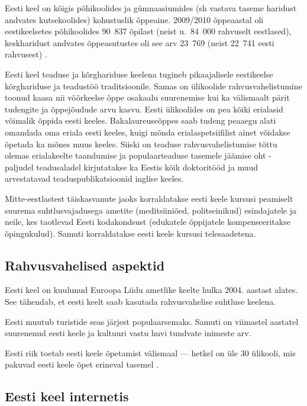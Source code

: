\documentclass[]{../metanetpaper}
\begin{document}
\begin{multicols}{2}
Eesti keel on kõigis põhikoolides ja gümnaasiumides (sh vastava taseme haridust andvates kutsekoolides) kohustuslik õppeaine. 
2009/2010 õppeaastal oli eestikeelsetes põhikoolides 90~837 õpilast
(neist u.~84~000 rahvuselt eestlased), keskharidust andvates
õppeasutustes oli see arv 23~769 (neist 22~741 eesti rahvusest)
\cite{DevPlan}. 


Eesti keel teaduse ja kõrghariduse keelena tugineb pikaajalisele eestikeelse kõrghariduse ja teadustöö traditsioonile. 
Samas on ülikoolide rahvusvahelistumine toonud kaasa nii võõrkeelse õppe osakaalu suurenemise kui ka välismaalt pärit tudengite ja õppejõudude arvu kasvu. 
Eesti ülikoolides on pea kõiki erialasid võimalik õppida eesti keeles. 
Bakalaureuseõppes saab tudeng peaaegu alati omandada oma eriala eesti keeles, kuigi mõnda erialaspetsiifilist ainet võidakse õpetada ka mõnes muus keeles.
Siiski on teaduse rahvusvahelistumise tõttu olemas erialakeelte taandumise ja populaarteaduse tasemele jäämise oht - paljudel teadusaladel kirjutatakse ka Eestis kõik doktoritööd ja muud arvestatavad teaduspublikatsioonid inglise keeles.
   
Mitte-eestlastest täiskasvanute jaoks kor\-ral\-datakse eesti keele kursusi peamiselt suu\-rema suhtlusvajadusega ametite (medit\-siini\-õed, politseinikud) esindajatele ja neile, kes taotlevad Eesti kodakondsust (edukatele õppijatele kompenseeritakse õpingukulud). 
Samuti korraldatakse eesti keele kursusi telesaadetena.
 
\subsection{Rahvusvahelised aspektid}

Eesti keel on kuulunud Euroopa Liidu ametlike keelte hulka 2004. aastast alates. 
See tähendab, et eesti keelt saab kasutada rahvusvahelise suhtluse keelena.

Eesti muutub turistide seas järjest populaarsemaks. 
Samuti on viimastel aastatel suurenenud eesti keele ja kultuuri vastu huvi tundvate inimeste arv.

Eesti riik toetab eesti keele õpetamist välismaal --- hetkel on üle 30 ülikooli, mis pakuvad eesti keele õpet erineval tasemel \cite{EstInst}.

\subsection{Eesti keel internetis}


\end{multicols}
\end{document}
